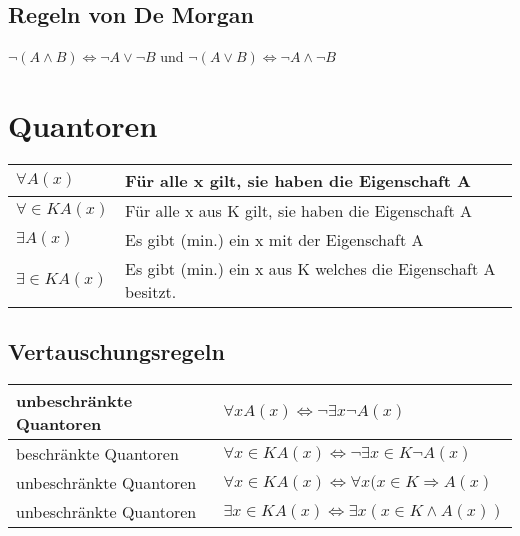 \subsection{Regeln von De Morgan}
\( \neg (A \wedge B) \Leftrightarrow \neg A \vee \neg B\) und \(\neg (A \vee B) \Leftrightarrow \neg A \wedge \neg B \)

\section{Quantoren}
\begin{longtable}{|p{}|p{}|}
	\hline
	\( \forall A(x) \) & Für alle x gilt, sie haben die Eigenschaft A \\
	\hline
	\( \forall \in K A(x) \) & Für alle x aus K gilt, sie haben die Eigenschaft A \\
	\hline
	\( \exists A(x) \) & Es gibt (min.) ein x mit der Eigenschaft A \\
	\hline
	\( \exists \in K A(x) \) & Es gibt (min.) ein x aus K welches die Eigenschaft A besitzt. \\
	\hline
\end{longtable}

\subsection{Vertauschungsregeln}
\begin{longtable}{|p{}|p{}|}
	\hline
	unbeschränkte Quantoren & \( \forall x A(x) \Leftrightarrow \neg \exists x \neg A(x) \)\\
	\hline
	beschränkte Quantoren & \( \forall x \in K A(x) \Leftrightarrow \neg \exists x \in K \neg A(x) \)\\
	\hline
	unbeschränkte Quantoren & \( \forall x \in K A(x) \Leftrightarrow \forall x (x \in K \Rightarrow A(x) \)\\
	\hline
	unbeschränkte Quantoren & \( \exists x \in K A(x) \Leftrightarrow \exists x (x \in K \wedge A(x)) \)\\
	\hline
\end{longtable}
